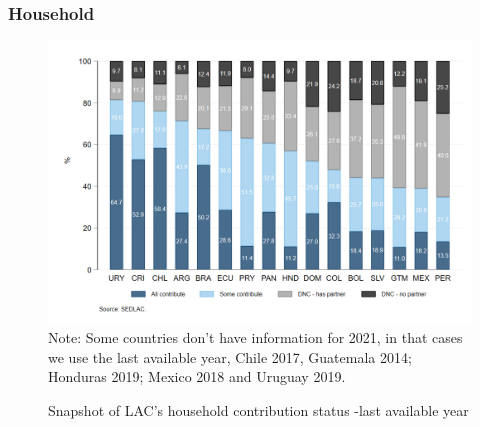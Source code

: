 \documentclass[english]{article}
\begin{document}
\subsubsection{Household}
\begin{figure}[!htb]
    \centering
     \caption{Snapshot of LAC’s household contribution status -last available year}     \includegraphics[scale=.3]{latex/figures/Household/snapshot_household.png}
    \label{fig:Householdlastyear}
    \footnotesize{Note: Some countries don’t have information for 2021, in that cases we use the last available year, Chile 2017, Guatemala 2014; Honduras 2019; Mexico 2018 and Uruguay 2019.}
\end{figure}
\end{document}
